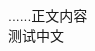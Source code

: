 \documentclass[a4paper,12pt]{article}
\begin{document}
\begin{CJK*}{UTF8}{gbsn}%

......正文内容\\
测试中文
\end{CJK*}
\end{document}
